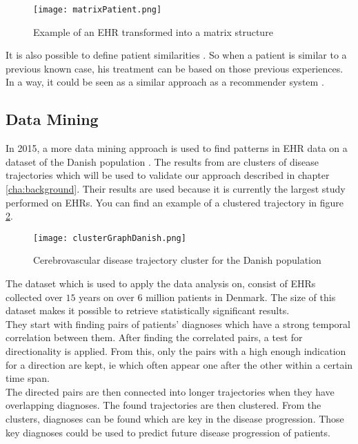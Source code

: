 \begin{figure}[!htb]
	\centering
	\texttt{[image: matrixPatient.png]}
	\caption{Example of an EHR transformed into a matrix structure \cite{EHRrecommender:article}}
	\label{fig:matrixPatient}
\end{figure}

It is also possible to define patient similarities \cite{EHRsimilarity:article}. So when a patient is similar to a previous known case, his treatment can be based on those previous experiences. In a way, it could be seen as a similar approach as a recommender system \cite{EHRrecommender:article}.


\subsection{Data Mining}
\label{sec:brunak}

In 2015, a more data mining approach is used to find patterns in EHR data on a dataset of the Danish population \cite{Brunak:article}. The results from \cite{Brunak:article} are clusters of disease trajectories which will be used to validate our approach described in chapter \ref{cha:background}. Their results are used because it is currently the largest study performed on EHRs. You can find an example of a clustered trajectory in figure \ref{fig:clusterGraphDanish}. \\

\begin{figure}[!htb]
	\centering
	\texttt{[image: clusterGraphDanish.png]}
	\caption{Cerebrovascular disease trajectory cluster for the Danish population \cite{Brunak:article}}
	\label{fig:clusterGraphDanish}
\end{figure}

The dataset which is used to apply the data analysis on, consist of EHRs collected over $15$ years on over $6$ million patients in Denmark. The size of this dataset makes it possible to retrieve statistically significant results. \\

They start with finding pairs of patients' diagnoses which have a strong temporal correlation between them. After finding the correlated pairs, a test for directionality is applied. From this, only the pairs with a high enough indication for a direction are kept, ie which often appear one after the other within a certain time span. \\

The directed pairs are then connected into longer trajectories when they have overlapping diagnoses. The found trajectories are then clustered. From the clusters, diagnoses can be found which are key in the disease progression. Those key diagnoses could be used to predict future disease progression of patients. 


